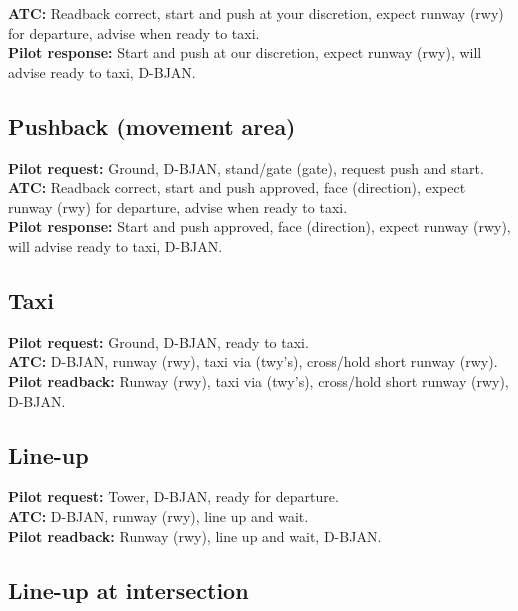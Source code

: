 \documentclass{article}
\newcommand{\callsign}{D-BJAN}
\begin{document}
\textbf{ATC:} Readback correct, start and push at your discretion, expect runway (rwy) for departure, advise when ready to taxi. \\

\textbf{Pilot response:} Start and push at our discretion, expect runway (rwy), will advise ready to taxi, \callsign.

\subsection*{Pushback (movement area)}

\textbf{Pilot request:} Ground, \callsign, stand/gate (gate), request push and start. \\

\textbf{ATC:} Readback correct, start and push approved, face (direction), expect runway (rwy) for departure, advise when ready to taxi. \\

\textbf{Pilot response:} Start and push approved, face (direction), expect runway (rwy), will advise ready to taxi, \callsign.

\subsection*{Taxi}

\textbf{Pilot request:} Ground, \callsign, ready to taxi. \\

\textbf{ATC:} \callsign, runway (rwy), taxi via (twy’s), cross/hold short runway (rwy). \\

\textbf{Pilot readback:} Runway (rwy), taxi via (twy’s), cross/hold short runway (rwy), \callsign.

\subsection*{Line-up}

\textbf{Pilot request:} Tower, \callsign, ready for departure. \\

\textbf{ATC:} \callsign, runway (rwy), line up and wait. \\

\textbf{Pilot readback:} Runway (rwy), line up and wait, \callsign.

\subsection*{Line-up at intersection}
\end{document}
